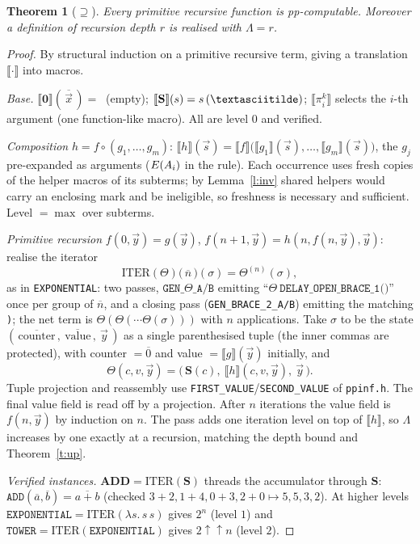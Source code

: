 \documentclass[10pt]{article}
\newtheorem{theorem}{Theorem}
\theoremstyle{definition}
\theoremstyle{remark}
\newcommand{\tok}[1]{\texttt{#1}}
\begin{document}
\begin{theorem}[$\supseteq$]\label{t:sup}
Every primitive recursive function is pp-computable. Moreover a definition of recursion depth $r$ is realised with
$\Lambda=r$.
\end{theorem}
\begin{proof}
By structural induction on a primitive recursive term, giving a translation $\llbracket\cdot\rrbracket$ into macros.

\emph{Base.} $\llbracket\mathbf 0\rrbracket(\,\overline{\vec x}\,)=\ $ (empty); $\llbracket\mathbf S\rrbracket(s)=s\,(\textasciitilde)$;
$\llbracket\pi^k_i\rrbracket$ selects the $i$-th argument (one function-like macro). All are level $0$ and verified.

\emph{Composition} $h=f\circ(g_1,\dots,g_m)$: $\llbracket h\rrbracket(\vec s)=\llbracket f\rrbracket\big(\llbracket
g_1\rrbracket(\vec s),\dots,\llbracket g_m\rrbracket(\vec s)\big)$, the $g_j$ pre-expanded as arguments ($E(A_i)$ in the
rule). Each occurrence uses fresh copies of the helper macros of its subterms; by Lemma~\ref{l:inv} shared helpers would
carry an enclosing mark and be ineligible, so freshness is necessary and sufficient. Level $=\max$ over subterms.

\emph{Primitive recursion} $f(0,\vec y)=g(\vec y)$, $f(n{+}1,\vec y)=h(n,f(n,\vec y),\vec y)$: realise the iterator
\[
\mathrm{ITER}(\Theta)\big(\overline{\,n\,}\big)(\sigma)=\Theta^{(n)}(\sigma),
\]
as in \texttt{EXPONENTIAL}: two passes, $\texttt{GEN\_}\Theta\texttt{\_A/B}$ emitting
``$\Theta\ \texttt{DELAY\_OPEN\_BRACE\_1()}$'' once per group of $\overline n$, and a closing pass
(\texttt{GEN\_BRACE\_2\_A/B}) emitting the matching \tok{)}; the net term is $\Theta(\Theta(\cdots\Theta(\sigma)))$ with
$n$ applications. Take $\sigma$ to be the state $(\,\overline{\text{counter}}\,,\ \overline{\text{value}}\,,\ \vec y\,)$ as a
single parenthesised tuple (the inner commas are protected), with counter $=\overline 0$ and value $=\llbracket
g\rrbracket(\vec y)$ initially, and
\[
\Theta(c,v,\vec y)=\big(\,\mathbf S(c),\ \llbracket h\rrbracket(c,v,\vec y),\ \vec y\,\big).
\]
Tuple projection and reassembly use \texttt{FIRST\_VALUE}/\texttt{SECOND\_VALUE} of \texttt{ppinf.h}. The final value
field is read off by a projection. After $n$ iterations the value field is $f(n,\vec y)$ by induction on $n$. The pass adds
one iteration level on top of $\llbracket h\rrbracket$, so $\Lambda$ increases by one exactly at a recursion, matching the
depth bound and Theorem~\ref{t:up}.

\emph{Verified instances.} $\mathbf{ADD}=\mathrm{ITER}(\mathbf S)$ threads the accumulator through $\mathbf S$:
$\texttt{ADD}(\overline a,\overline b)=\overline{a+b}$ (checked $3{+}2,1{+}4,0{+}3,2{+}0\mapsto5,5,3,2$). At higher levels
$\texttt{EXPONENTIAL}=\mathrm{ITER}(\lambda s.\,s\,s)$ gives $2^{n}$ (level $1$) and $\texttt{TOWER}=\mathrm{ITER}
(\texttt{EXPONENTIAL})$ gives $2\uparrow\uparrow n$ (level $2$).
\end{proof}
\end{document}
